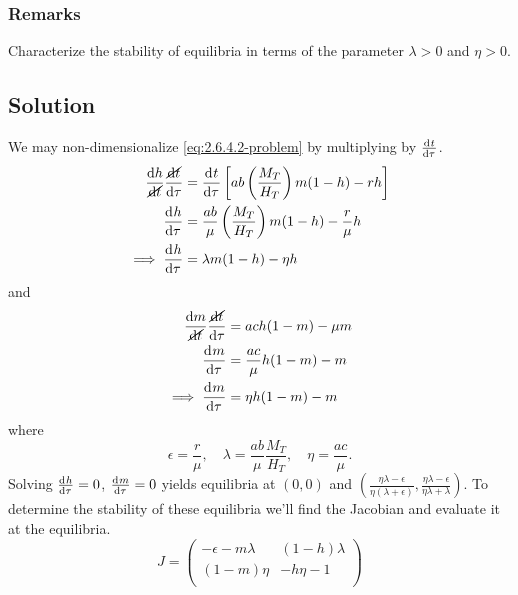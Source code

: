 \documentclass[12pt]{article}
\begin{document}
\subsubsection*{Remarks}
Characterize the stability of equilibria in terms of the parameter $\lambda>0$
and $\eta>0$.

\subsection*{Solution}
We may non-dimensionalize \cref{eq:2.6.4.2-problem} by multiplying by
$\frac{\mathrm{d}^{} {t}}{\mathrm{d}{\tau}^{}}$.
\begin{equation*}
  \begin{aligned}
    \frac{\mathrm{d}{h}}{\cancel{\mathrm{d}{t}}}\frac{\cancel{\mathrm{d}{t}}}{\mathrm{d}{\tau}} &=
    \frac{\mathrm{d}^{} {t}}{\mathrm{d}{\tau}^{}}\left[ab\left(\frac{M_T}{H_T}\right)m(1-h)-rh \right] \\
    \frac{\mathrm{d}^{} {h}}{\mathrm{d}{\tau}^{}} &= \frac{ab}{\mu}\left(\frac{M_T}{H_T}\right)m(1-h) -
    \frac{r}{\mu}h \\
    \implies \frac{\mathrm{d}^{} {h}}{\mathrm{d}{\tau}^{}} &= \lambda m(1-h) - \eta h \\
  \end{aligned}
\end{equation*}
and
\begin{equation*}
  \begin{aligned}
    \frac{\mathrm{d}{m}}{\cancel{\mathrm{d}{t}}}\frac{\cancel{\mathrm{d}{t}}}{\mathrm{d}{\tau}} &= ach(1-m)-\mu m \\
    \frac{\mathrm{d}^{} {m}}{\mathrm{d}{\tau}^{}} &= \frac{ac}{\mu}h(1-m) - m \\
    \implies \frac{\mathrm{d}^{} {m}}{\mathrm{d}{\tau}^{}} &= \eta h(1-m) - m \\
  \end{aligned}
\end{equation*}
where
\begin{equation*}
  \epsilon=\frac{r}{\mu},\quad \lambda=\frac{ab}{\mu}\frac{M_T}{H_T},\quad\eta=\frac{ac}{\mu}.
\end{equation*}
\newcommand{\otherequilibrium}{\left(\frac{\eta\lambda-\epsilon}{\eta(\lambda+\epsilon)},
  \frac{\eta\lambda-\epsilon}{\eta\lambda+\lambda}\right)}
Solving $\frac{\mathrm{d}^{} {h}}{\mathrm{d}{\tau}^{}}=0$, $\frac{\mathrm{d}^{} {m}}{\mathrm{d}{\tau}^{}}=0$ yields equilibria at $(0,0)$ and
$\otherequilibrium$. To determine the stability of these equilibria we'll find
the Jacobian and evaluate it at the equilibria.
\begin{equation*}
  J =
  \begin{pmatrix}
    -\epsilon-m\lambda & (1-h)\lambda \\
    (1-m)\eta  & -h\eta-1 \\
  \end{pmatrix}
\end{equation*}
\end{document}
